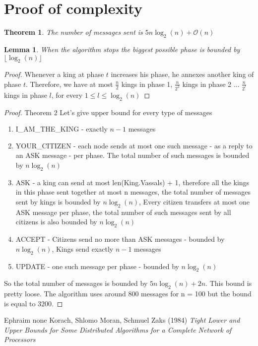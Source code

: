 \documentclass{article}
\newtheorem{lemma}{Lemma}
\newtheorem{theorem}{Theorem}
\begin{document}
\section*{Proof of complexity}
\begin{theorem}
The number of messages sent is \(5n\log_2(n) + \mathcal{O}(n)\)
\end{theorem}
\begin{lemma}
When the algorithm stops the biggest possible phase is bounded by \(\lfloor \log_2(n) \rfloor\)
\end{lemma}
\begin{proof}
Whenever a king at phase \(t\) 
increases his phase, he annexes another 
king of phase \(t\). Therefore, we have at 
most \(\frac{n}{2}\) kings in phase 1, \(\frac{n}{2^2}\) kings in  phase 2 ... \(\frac{n}{2^l}\) kings in phase \(l\), for every \(1 \leq l \leq \log_2(n)\)
\end{proof}
\begin{proof}{Theorem 2}
Let's give upper bound for every type of messages
\begin{enumerate}
    \item I\_AM\_THE\_KING - exactly \(n-1\) messages
    \item YOUR\_CITIZEN - each node sends at most one such message - as a reply to an ASK message - per phase. The total number of such messages is bounded by \(n\log_2(n)\)
    \item ASK - a king can send at most len(King.Vassals) + 1, therefore all the kings in this phase sent together at most n messages, the total number of messages sent by kings is bounded by \(n\log_2(n)\), Every citizen transfers at most one ASK message per phase, the total number of such messages sent by all citizens is also bounded by \(n\log_2(n)\) 
    \item ACCEPT - Citizens send no more than ASK messages - bounded by \(n\log_2(n)\), Kings send exactly \(n-1\) messages
    \item UPDATE - one such message per phase - bounded by  \(n\log_2(n)\) 
\end{enumerate}
    So the total number of messages is bounded by \(5n\log_2(n) + 2n\). This bound is pretty loose. The algorithm uses around 800 messages for n = 100 but the bound is equal to 3200.
\end{proof}

\begin{thebibliography}{9}
Ephraim none Korach, Shlomo Moran, Schmuel Zaks (1984)
\emph{Tight Lower and Upper Bounds for Some Distributed Algorithms for a Complete Network of Processors}
\end{thebibliography}
\end{document}
